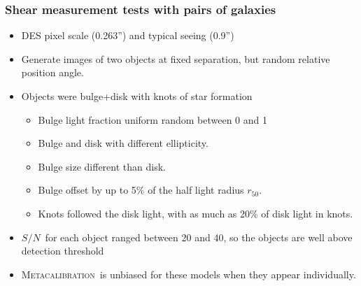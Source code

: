 \documentclass{beamer}
\newcommand{\Mcal}{\textsc{Metacalibration}}
\newcommand{\snr}{$S/N$}
\newcommand{\hlr}{$r_{50}$}
\begin{document}
\frame
{
    \frametitle{Shear measurement tests with pairs of galaxies}

 
    \begin{itemize}

        \item DES pixel scale (0.263'') and typical seeing (0.9'')
        \item Generate images of two objects at fixed separation, but random
            relative position angle.

        \item Objects were bulge+disk with knots of star formation
            \begin{itemize}
                \item Bulge light fraction uniform random between 0 and 1
                \item Bulge and disk with different ellipticity.
                \item Bulge size different than disk.
                \item Bulge offset by up to 5\% of the half light radius \hlr.
                \item Knots followed the disk light, with as much as 20\%
                    of disk light in knots.
            \end{itemize}
        \item \snr\ for each object ranged between 20 and 40, so the objects
            are well above detection threshold

        \item \Mcal\ is unbiased for these models when they appear
            individually.

    \end{itemize}

}
\end{document}
